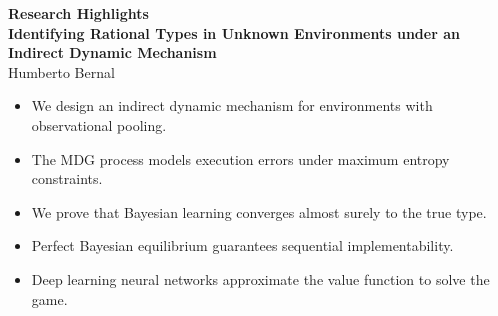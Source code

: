 \documentclass[12pt]{article}
\begin{document}
\doublespacing

\begin{center}
\textbf{Research Highlights} \\
\vspace{1em}
\textbf{Identifying Rational Types in Unknown Environments under an Indirect Dynamic Mechanism} \\
Humberto Bernal
\end{center}

\vspace{2em}

\begin{itemize}
    \item We design an indirect dynamic mechanism for environments with observational pooling.
    \item The MDG process models execution errors under maximum entropy constraints.
    \item We prove that Bayesian learning converges almost surely to the true type.
    \item Perfect Bayesian equilibrium guarantees sequential implementability.
    \item Deep learning neural networks approximate the value function to solve the game.
\end{itemize}
\end{document}
